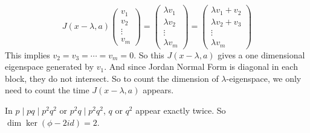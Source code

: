 \documentclass[a4paper, 12pt]{article}
\begin{document}
\begin{solution}
\begin{enumerate}[(a)]
\begin{claimproof}
\[J(x-\lambda,a)\begin{pmatrix}
	v_1\\ 
	v_2\\ 
	\vdots\\ 
	v_m
\end{pmatrix}=\begin{pmatrix}
	\lambda v_1\\ 
	\lambda v_2\\ 
	\vdots\\ 
	\lambda v_m
\end{pmatrix}=\begin{pmatrix}
	\lambda v_1+v_2\\ 
	\lambda v_2+v_3\\ 
	\vdots\\ 
	\lambda v_m
\end{pmatrix}\]
This implies \(v_2=v_3=\cdots=v_m=0\). So this \(J(x-\lambda,a)\) gives a one dimensional eigenspace generated by \(v_1\). And since Jordan Normal Form is diagonal in each block, they do not intersect. So to count 
the dimension of \(\lambda\)-eigenspace, we only need to count the time \(J(x-\lambda,a)\) appears. 
\end{claimproof}

In \(p\mid pq\mid p^2q^2\) or \(p^2q\mid p^2q^2\), \(q\) or \(q^2\) appear exactly twice. So \(\dim \ker (\phi-2id)=2\).
\end{enumerate} 
\end{solution}
\end{document}
